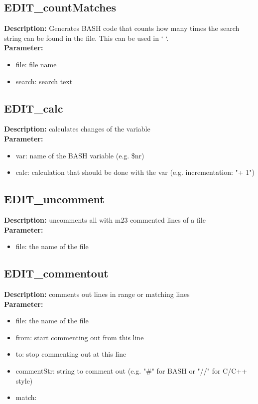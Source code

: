 \subsection{EDIT\_countMatches}
\textbf{Description:} Generates BASH code that counts how many times the search string can be found in the file. This can be used in ` `.\\
\textbf{Parameter:}
\begin{itemize}
\item file: file name
\item search: search text
\end{itemize}

\subsection{EDIT\_calc}
\textbf{Description:} calculates changes of the variable\\
\textbf{Parameter:}
\begin{itemize}
\item var: name of the BASH variable (e.g. \$nr)
\item calc: calculation that should be done with the var (e.g. incrementation: "+ 1")
\end{itemize}

\subsection{EDIT\_uncomment}
\textbf{Description:} uncomments all with m23 commented lines of a file\\
\textbf{Parameter:}
\begin{itemize}
\item file: the name of the file
\end{itemize}

\subsection{EDIT\_commentout}
\textbf{Description:} comments out lines in range or matching lines\\
\textbf{Parameter:}
\begin{itemize}
\item file: the name of the file
\item from: start commenting out from this line
\item to: stop commenting out at this line
\item commentStr: string to comment out (e.g. "\#" for BASH or "//" for C/C++ style)
\item match: 
\end{itemize}

